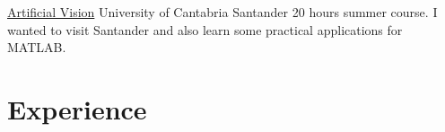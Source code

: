 \documentclass[11pt,a4paper,roman]{moderncv}
\begin{document}
	{\href{http://cursosdeverano.unican.es/cursos-anteriores/Paginas/Detalle-curso.aspx?p_id=1094}
	{Artificial Vision}}
	{University of Cantabria}
	{Santander}
	{}
	{20 hours summer course. I wanted to visit Santander and also learn some practical applications for MATLAB.}








\section{Experience}
\end{document}

